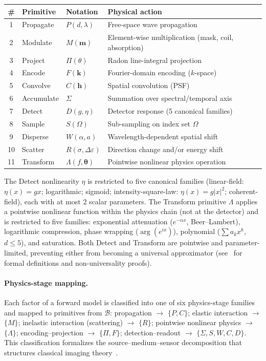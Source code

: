 \documentclass[11pt]{article}
\newcommand{\Blib}{\mathcal{B}}
\begin{document}
\begin{table}[h]
\centering\small
\begin{tabular}{@{}clll@{}}
\toprule
\# & Primitive & Notation & Physical action \\
\midrule
1 & Propagate  & $P(d,\lambda)$ & Free-space wave propagation \\
2 & Modulate   & $M(\mathbf{m})$ & Element-wise multiplication (mask, coil, absorption) \\
3 & Project    & $\Pi(\theta)$ & Radon line-integral projection \\
4 & Encode     & $F(\mathbf{k})$ & Fourier-domain encoding ($k$-space) \\
5 & Convolve   & $C(\mathbf{h})$ & Spatial convolution (PSF) \\
6 & Accumulate & $\Sigma$ & Summation over spectral/temporal axis \\
7 & Detect     & $D(g,\eta)$ & Detector response (5 canonical families) \\
8 & Sample     & $S(\Omega)$ & Sub-sampling on index set $\Omega$ \\
9 & Disperse   & $W(\alpha,a)$ & Wavelength-dependent spatial shift \\
10 & Scatter   & $R(\sigma,\Delta\varepsilon)$ & Direction change and/or energy shift \\
11 & Transform & $\Lambda(f,\boldsymbol{\theta})$ & Pointwise nonlinear physics operation \\
\bottomrule
\end{tabular}
\end{table}

\noindent The Detect nonlinearity $\eta$ is restricted to five canonical families (linear-field: $\eta(x) = gx$; logarithmic; sigmoid; intensity-square-law: $\eta(x) = g|x|^2$; coherent-field), each with at most 2 scalar parameters. The Transform primitive $\Lambda$ applies a pointwise nonlinear function within the physics chain (not at the detector) and is restricted to five families: exponential attenuation ($e^{-\alpha x}$, Beer--Lambert), logarithmic compression, phase wrapping ($\arg(e^{ix})$), polynomial ($\sum a_k x^k$, $d \leq 5$), and saturation. Both Detect and Transform are pointwise and parameter-limited, preventing either from becoming a universal approximator (see~\cite{yang2026fpt} for formal definitions and non-universality proofs).

\paragraph{Physics-stage mapping.}
Each factor of a forward model is classified into one of six physics-stage families and mapped to primitives from $\Blib$: propagation $\to$ $\{P, C\}$; elastic interaction $\to$ $\{M\}$; inelastic interaction (scattering) $\to$ $\{R\}$; pointwise nonlinear physics $\to$ $\{\Lambda\}$; encoding--projection $\to$ $\{\Pi, F\}$; detection--readout $\to$ $\{\Sigma, S, W, C, D\}$. This classification formalizes the source--medium--sensor decomposition that structures classical imaging theory~\cite{brady2009optical}.
\end{document}
